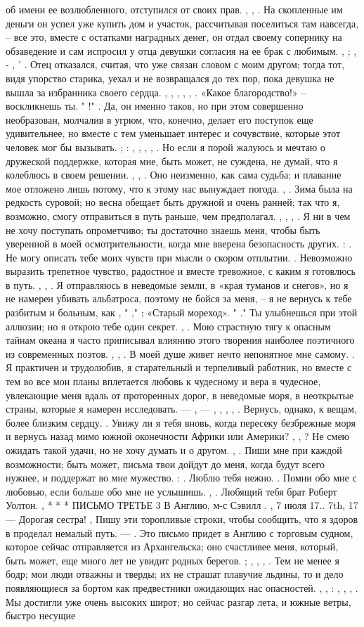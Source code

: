 об имени ее возлюбленного, отступился от своих прав. , , . На скопленные им деньги он успел уже купить дом и участок, рассчитывая поселиться там навсегда, – все это, вместе с остатками наградных денег, он отдал своему сопернику на обзаведение и сам испросил у отца девушки согласия на ее брак с любимым. , ; , - , ' . Отец отказался, считая, что уже связан словом с моим другом; тогда тот, видя упорство старика, уехал и не возвращался до тех пор, пока девушка не вышла за избранника своего сердца. , , , , , . «Какое благородство!» –воскликнешь ты. " !" . Да, он именно таков, но при этом совершенно необразован, молчалив в угрюм, что, конечно, делает его поступок еще удивительнее, но вместе с тем уменьшает интерес и сочувствие, которые этот человек мог бы вызывать. ; : , , , , . Но если я порой жалуюсь и мечтаю о дружеской поддержке, которая мне, быть может, не суждена, не думай, что я колеблюсь в своем решении. , , . Оно неизменно, как сама судьба; и плавание мое отложено лишь потому, что к этому нас вынуждает погода. , . Зима была на редкость суровой; но весна обещает быть дружной и очень ранней; так что я, возможно, смогу отправиться в путь раньше, чем предполагал. , , , . Я ни в чем не хочу поступать опрометчиво; ты достаточно знаешь меня, чтобы быть уверенной в моей осмотрительности, когда мне вверена безопасность других. : . Не могу описать тебе моих чувств при мысли о скором отплытии. . Невозможно выразить трепетное чувство, радостное и вместе тревожное, с каким я готовлюсь в путь. , , . Я отправляюсь в неведомые земли, в «края туманов и снегов», но я не намерен убивать альбатроса, поэтому не бойся за меня, – я не вернусь к тебе разбитым и больным, как , " ," ; «Старый мореход». " ." Ты улыбнешься при этой аллюзии; но я открою тебе один секрет. , . Мою страстную тягу к опасным тайнам океана я часто приписывал влиянию этого творения наиболее поэтичного из современных поэтов. , , . В моей душе живет нечто непонятное мне самому. . Я практичен и трудолюбив, я старательный и терпеливый работник, но вместе с тем во все мои планы вплетается любовь к чудесному и вера в чудесное, увлекающие меня вдаль от проторенных дорог, в неведомые моря, в неоткрытые страны, которые я намерен исследовать. — , — , , , , . Вернусь, однако, к вещам, более близким сердцу. . Увижу ли я тебя вновь, когда пересеку безбрежные моря и вернусь назад мимо южной оконечности Африки или Америки? , , ? Не смею ожидать такой удачи, но не хочу думать и о другом. , . Пиши мне при каждой возможности; быть может, письма твои дойдут до меня, когда будут всего нужнее, и поддержат во мне мужество. : . Люблю тебя нежно. . Помни обо мне с любовью, если больше обо мне не услышишь. , . Любящий тебя брат Роберт Уолтон. , * * * ПИСЬМО ТРЕТЬЕ 3 В Англию, м-с Сэвилл . , 7 июля 17.. 7th, 17 — Дорогая сестра! , Пишу эти торопливые строки, чтобы сообщить, что я здоров в проделал немалый путь. — . Это письмо придет в Англию с торговым судном, которое сейчас отправляется из Архангельска; оно счастливее меня, который, быть может, еще много лет не увидит родных берегов. ; , , , . Тем не менее я бодр; мои люди отважны и тверды; их не страшат плавучие льдины, то и дело появляющиеся за бортом как предвестники ожидающих нас опасностей. , , : , , , . Мы достигли уже очень высоких широт; но сейчас разгар лета, и южные ветры, быстро несущие 